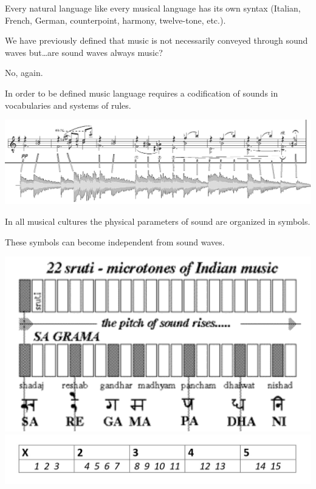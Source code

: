 Every natural language like every musical language has its own syntax (Italian, French, German, counterpoint, harmony, twelve-tone, etc.).

We have previously defined that music is not necessarily conveyed through sound waves but\ldots are sound waves always music?

No, again.

In order to be defined music language requires a codification of sounds in vocabularies and systems of rules.

\begin{center}
\includegraphics[scale=0.9]{../img/ondenote.png}
\end{center}

In all musical cultures the physical parameters of sound are organized in symbols.

These symbols can become independent from sound waves.

\begin{center}
\includegraphics[scale=0.4]{../img/india.png}\break
\includegraphics[scale=0.3]{../img/rtmoindia.png}
\end{center}

